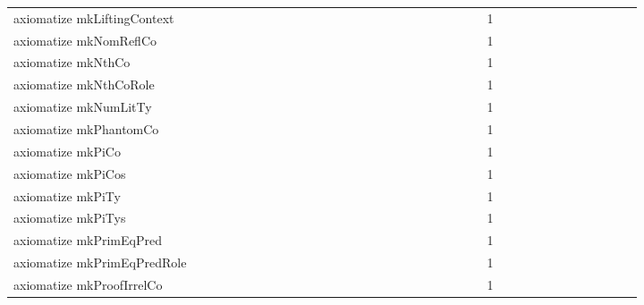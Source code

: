 {\begin{tabular}{l|rrr|rrr|rrr}
axiomatize mkLiftingContext &  &  &  &  &  &  &  &  &  &  &  &  &  &  &  &  &  &  &  &  &  &  &  & 1 &  &  &  &  &  &  &  &  &  &  &  & \\
axiomatize mkNomReflCo &  &  &  &  &  &  &  &  &  &  &  &  &  &  &  &  &  &  &  &  &  &  &  & 1 &  &  &  &  &  &  &  &  &  &  &  & \\
axiomatize mkNthCo &  &  &  &  &  &  &  &  &  &  &  &  &  &  &  &  &  &  &  &  &  &  &  & 1 &  &  &  &  &  &  &  &  &  &  &  & \\
axiomatize mkNthCoRole &  &  &  &  &  &  &  &  &  &  &  &  &  &  &  &  &  &  &  &  &  &  &  & 1 &  &  &  &  &  &  &  &  &  &  &  & \\
axiomatize mkNumLitTy &  &  &  &  &  &  &  &  &  &  &  &  &  &  &  &  &  &  &  &  &  &  &  & 1 &  &  &  &  &  &  &  &  &  &  &  & \\
axiomatize mkPhantomCo &  &  &  &  &  &  &  &  &  &  &  &  &  &  &  &  &  &  &  &  &  &  &  & 1 &  &  &  &  &  &  &  &  &  &  &  & \\
axiomatize mkPiCo &  &  &  &  &  &  &  &  &  &  &  &  &  &  &  &  &  &  &  &  &  &  &  & 1 &  &  &  &  &  &  &  &  &  &  &  & \\
axiomatize mkPiCos &  &  &  &  &  &  &  &  &  &  &  &  &  &  &  &  &  &  &  &  &  &  &  & 1 &  &  &  &  &  &  &  &  &  &  &  & \\
axiomatize mkPiTy &  &  &  &  &  &  &  &  &  &  &  &  &  &  &  &  &  &  &  &  &  &  &  & 1 &  &  &  &  &  &  &  &  &  &  &  & \\
axiomatize mkPiTys &  &  &  &  &  &  &  &  &  &  &  &  &  &  &  &  &  &  &  &  &  &  &  & 1 &  &  &  &  &  &  &  &  &  &  &  & \\
axiomatize mkPrimEqPred &  &  &  &  &  &  &  &  &  &  &  &  &  &  &  &  &  &  &  &  &  &  &  & 1 &  &  &  &  &  &  &  &  &  &  &  & \\
axiomatize mkPrimEqPredRole &  &  &  &  &  &  &  &  &  &  &  &  &  &  &  &  &  &  &  &  &  &  &  & 1 &  &  &  &  &  &  &  &  &  &  &  & \\
axiomatize mkProofIrrelCo &  &  &  &  &  &  &  &  &  &  &  &  &  &  &  &  &  &  &  &  &  &  &  & 1 &  &  &  &  &  &  &  &  &  &  &  & \\

\end{tabular}}
